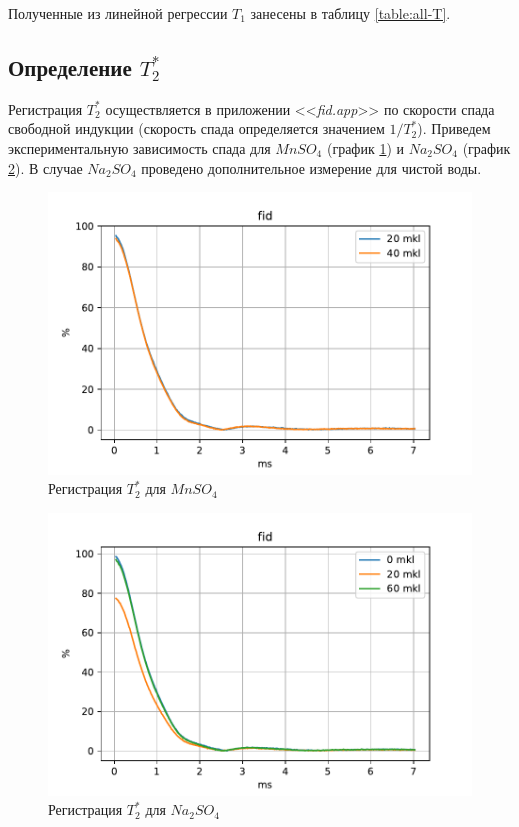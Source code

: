 Полученные из линейной регрессии $ T_1 $ занесены в таблицу \ref{table:all-T}.

\subsection{Определение $ T_2^* $}
Регистрация $ T_2^* $ осуществляется в приложении <<\textit{fid.app}>> по скорости спада свободной индукции (скорость спада определяется значением $ 1/T_2^* $). Приведем экспериментальную зависимость спада для $ Mn SO_4 $ (график \ref{fig:mnfid}) и $ Na_2 SO_4 $ (график \ref{fig:nafid}). В случае $ Na_2 SO_4 $ проведено дополнительное измерение для чистой воды.

\begin{figure}[h]
	\hspace{-5em}
	\includegraphics[width=1.2\linewidth]{data/Mn_fid}
	\caption{Регистрация $ T_2^* $ для $ Mn SO_4 $}
	\label{fig:mnfid}
\end{figure}

\begin{figure}[h]
	\hspace{-5em}
	\includegraphics[width=1.2\linewidth]{data/Na_fid}
	\caption{Регистрация $ T_2^* $ для $ Na_2 SO_4 $}
	\label{fig:nafid}
\end{figure}

